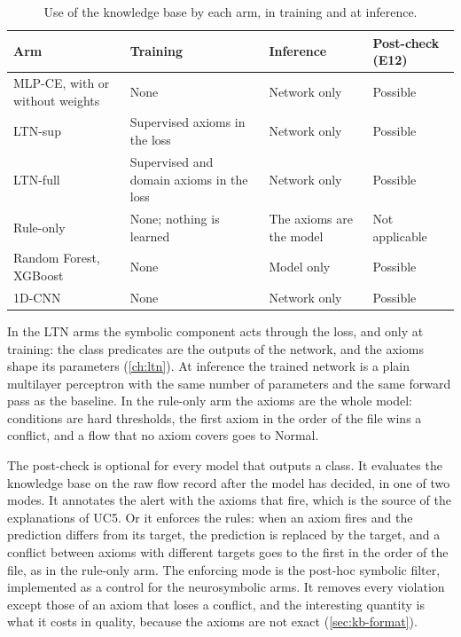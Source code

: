 \begin{table}[t]
\centering
\small
\caption{Use of the knowledge base by each arm, in training and at inference.}
\label{tab:symbolic-placement}
\setlength{\tabcolsep}{4pt}
\begin{tabular}{@{}p{2.6cm}p{3.7cm}p{3.1cm}p{3cm}@{}}
\toprule
Arm & Training & Inference & Post-check (E12) \\
\midrule
MLP-CE, with or without weights & None & Network only & Possible \\
LTN-sup & Supervised axioms in the loss & Network only & Possible \\
LTN-full & Supervised and domain axioms in the loss & Network only & Possible \\
Rule-only & None; nothing is learned & The axioms are the model & Not applicable \\
Random Forest, XGBoost & None & Model only & Possible \\
1D-CNN & None & Network only & Possible \\
\bottomrule
\end{tabular}
\end{table}

In the LTN arms the symbolic component acts through the loss, and only at
training: the class predicates are the outputs of the network, and the axioms
shape its parameters (\cref{ch:ltn}). At inference the trained network is a plain
multilayer perceptron with the same number of parameters and the same forward pass
as the baseline. In the rule-only arm the axioms are the whole model: conditions
are hard thresholds, the first axiom in the order of the file wins a conflict, and
a flow that no axiom covers goes to Normal.

The post-check is optional for every model that outputs a class. It evaluates the
knowledge base on the raw flow record after the model has decided, in one of two
modes. It annotates the alert with the axioms that fire, which is the source of the
explanations of UC5. Or it enforces the rules: when an axiom fires and the prediction
differs from its target, the prediction is replaced by the target, and a conflict
between axioms with different targets goes to the first in the order of the file, as
in the rule-only arm. The enforcing mode is the post-hoc symbolic filter, implemented
as a control for the neurosymbolic arms. It removes every
violation except those of an axiom that loses a conflict, and the interesting
quantity is what it costs in quality, because the axioms are not exact
(\cref{sec:kb-format}).

